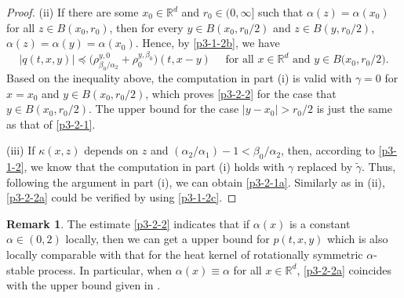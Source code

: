 \documentclass[a4paper,11pt]{amsart}
\newcommand{\R}{\mathds R}
\newcommand{\B}{\beta}
\newcommand{\p}{\preceq}
\newcommand{\K}{\kappa}
\newcommand{\A}{\alpha}
\newcommand{\G}{\gamma}
\theoremstyle{definition}
\newtheorem{remark}[theorem]{Remark}
\begin{document}
\begin{proof}
(ii) If there are some $x_0 \in \R^d$ and $r_0\in(0,\infty]$ such
that $\alpha(z)=\alpha(x_0)$ for all $z \in B(x_0,r_0)$, then for
every $y \in B(x_0,{r_0}/{2})$ and $z \in
B(y,{r_0}/{2})$,
$
\A(z)=\A(y)=\A(x_0).
$
Hence, by \eqref{p3-1-2b}, we have
\begin{equation*}
|q(t,x,y)|\p
\Big(\rho^{y,0}_{{\B_0}/{\A_2}}+\rho^{y,\B_0}_0\Big)(t,x-y)\quad\textrm{ for all }
x\in \R^d\textrm{ and }y \in B\big(x_0,{r_0}/{2}\big).
\end{equation*}
Based on the inequality above, the computation in part (i) is valid
with $\G=0$ for $x=x_0$ and $y \in B(x_0,{r_0}/{2})$, which
proves \eqref{p3-2-2} for the case that $y \in
B(x_0,{r_0}/{2})$. The upper bound for the case
$|y-x_0|>{r_0}/{2}$ is just the same as that of \eqref{p3-2-1}.


(iii) If $\K(x,z)$ depends on $z$ and
${(\A_2/\A_1)}-1<{\B_0}/{\A_2}$, then, according to
\eqref{p3-1-2}, we know that the computation in part (i) holds with
$\G$ replaced by $\tilde\G$. Thus, following the argument in part
(i), we can obtain \eqref{p3-2-1a}. Similarly as in (ii),
\eqref{p3-2-2a} could be verified by using \eqref{p3-1-2c}.
\end{proof}

\begin{remark}
The estimate \eqref{p3-2-2} indicates that if $\A(x)$ is a
constant $\A\in(0,2)$ locally, then we can get a upper bound for
$p(t,x,y)$ which is also locally comparable with that for the heat
kernel of rotationally symmetric $\A$-stable process.  In particular, when
$\A(x)\equiv\A$ for all $x \in \R^d$, \eqref{p3-2-2a} coincides with
the upper bound given in \cite[Therem 1.1]{CZ}.
\end{remark}
\end{document}
